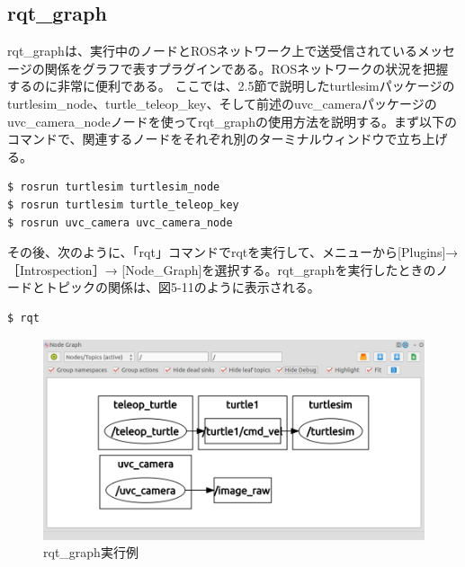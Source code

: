 \subsection{rqt\_graph}

rqt\_graphは、実行中のノードとROSネットワーク上で送受信されているメッセージの関係をグラフで表すプラグインである。ROSネットワークの状況を把握するのに非常に便利である。
ここでは、2.5節で説明したturtlesimパッケージのturtlesim\_node、turtle\_teleop\_key、そして前述のuvc\_cameraパッケージのuvc\_camera\_nodeノードを使ってrqt\_graphの使用方法を説明する。まず以下のコマンドで、関連するノードをそれぞれ別のターミナルウィンドウで立ち上げる。

\begin{lstlisting}[language=ROS]
$ rosrun turtlesim turtlesim_node
$ rosrun turtlesim turtle_teleop_key
$ rosrun uvc_camera uvc_camera_node
\end{lstlisting}

その後、次のように、「rqt」コマンドでrqtを実行して、メニューから[Plugins]→［Introspection］→ [Node\_Graph]を選択する。rqt\_graphを実行したときのノードとトピックの関係は、図5-11のように表示される。

\begin{lstlisting}[language=ROS]
$ rqt
\end{lstlisting}

\begin{figure}[htp]
  \centering
  \includegraphics[width=\columnwidth]{pictures/chapter5/pic_05_11.png}
  \caption{rqt\_graph実行例}
\end{figure}

